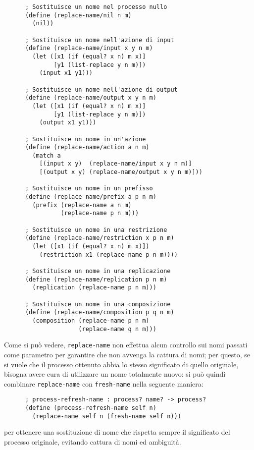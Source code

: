 \begin{lstlisting}
      ; Sostituisce un nome nel processo nullo
      (define (replace-name/nil n m)
        (nil))

      ; Sostituisce un nome nell'azione di input
      (define (replace-name/input x y n m)
        (let ([x1 (if (equal? x n) m x)]
              [y1 (list-replace y n m)])
          (input x1 y1)))

      ; Sostituisce un nome nell'azione di output
      (define (replace-name/output x y n m)
        (let ([x1 (if (equal? x n) m x)]
              [y1 (list-replace y n m)])
          (output x1 y1)))

      ; Sostituisce un nome in un'azione
      (define (replace-name/action a n m)
        (match a
          [(input x y)  (replace-name/input x y n m)]
          [(output x y) (replace-name/output x y n m)]))

      ; Sostituisce un nome in un prefisso
      (define (replace-name/prefix a p n m)
        (prefix (replace-name a n m)
                (replace-name p n m)))

      ; Sostituisce un nome in una restrizione
      (define (replace-name/restriction x p n m)
        (let ([x1 (if (equal? x n) m x)])
          (restriction x1 (replace-name p n m))))

      ; Sostituisce un nome in una replicazione
      (define (replace-name/replication p n m)
        (replication (replace-name p n m)))

      ; Sostituisce un nome in una composizione
      (define (replace-name/composition p q n m)
        (composition (replace-name p n m)
                     (replace-name q n m)))
\end{lstlisting}

Come si pu\`o vedere, \lstinline{replace-name} non effettua alcun
controllo sui nomi passati come parametro per garantire che non avvenga
la cattura di nomi; per questo, se si vuole che il processo ottenuto
abbia lo stesso significato di quello originale, bisogna avere cura di
utilizzare un nome totalmente nuovo: si pu\`o quindi combinare
\lstinline{replace-name} con \lstinline{fresh-name} nella seguente
maniera:

\begin{lstlisting}
      ; process-refresh-name : process? name? -> process?
      (define (process-refresh-name self n)
        (replace-name self n (fresh-name self n)))
\end{lstlisting}

per ottenere una sostituzione di nome che rispetta sempre il significato
del processo originale, evitando cattura di nomi ed ambiguit\`a.

